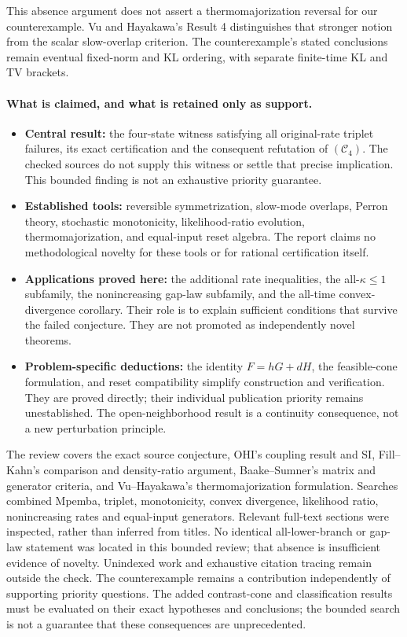 \documentclass[11pt]{article}
\begin{document}
This absence argument does not assert a thermomajorization reversal for our counterexample. Vu and Hayakawa's Result 4 distinguishes that stronger notion from the scalar slow-overlap criterion. The counterexample's stated conclusions remain eventual fixed-norm and KL ordering, with separate finite-time KL and TV brackets.

\paragraph{What is claimed, and what is retained only as support.}
\begin{itemize}
\item \textbf{Central result:} the four-state witness satisfying all original-rate triplet failures, its exact certification and the consequent refutation of $(\mathcal C_4)$. The checked sources do not supply this witness or settle that precise implication. This bounded finding is not an exhaustive priority guarantee.
\item \textbf{Established tools:} reversible symmetrization, slow-mode overlaps, Perron theory, stochastic monotonicity, likelihood-ratio evolution, thermomajorization, and equal-input reset algebra. The report claims no methodological novelty for these tools or for rational certification itself.
\item \textbf{Applications proved here:} the additional rate inequalities, the all-$\kappa\leq1$ subfamily, the nonincreasing gap-law subfamily, and the all-time convex-divergence corollary. Their role is to explain sufficient conditions that survive the failed conjecture. They are not promoted as independently novel theorems.
\item \textbf{Problem-specific deductions:} the identity $F=hG+dH$, the feasible-cone formulation, and reset compatibility simplify construction and verification. They are proved directly; their individual publication priority remains unestablished. The open-neighborhood result is a continuity consequence, not a new perturbation principle.
\end{itemize}

The review covers the exact source conjecture, OHI's coupling result and SI, Fill--Kahn's comparison and density-ratio argument, Baake--Sumner's matrix and generator criteria, and Vu--Hayakawa's thermomajorization formulation. Searches combined Mpemba, triplet, monotonicity, convex divergence, likelihood ratio, nonincreasing rates and equal-input generators. Relevant full-text sections were inspected, rather than inferred from titles. No identical all-lower-branch or gap-law statement was located in this bounded review; that absence is insufficient evidence of novelty. Unindexed work and exhaustive citation tracing remain outside the check. The counterexample remains a contribution independently of supporting priority questions. The added contrast-cone and classification results must be evaluated on their exact hypotheses and conclusions; the bounded search is not a guarantee that these consequences are unprecedented.
\end{document}
